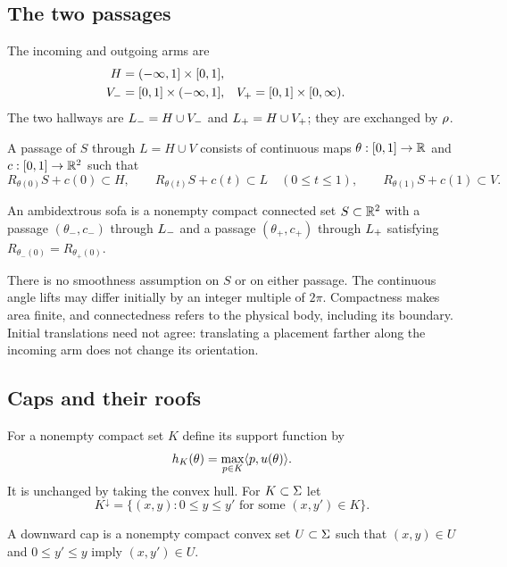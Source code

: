\subsection{The two passages}
The incoming and outgoing arms are
\begin{align*}
 H&=(-\infty,1]\times[0,1],\\
 V_-&=[0,1]\times(-\infty,1],&
 V_+&=[0,1]\times[0,\infty).
\end{align*}
The two hallways are $L_-=H\cup V_-$ and $L_+=H\cup V_+$;
they are exchanged by $\rho$.

\begin{definition}\label{def:passage}
A passage of $S$ through $L=H\cup V$ consists of continuous maps
$\theta:[0,1]\to\mathbb{R}$ and $c:[0,1]\to\mathbb{R}^2$ such that
\[
 R_{\theta(0)}S+c(0)\subset H,\qquad
 R_{\theta(t)}S+c(t)\subset L\quad(0\le t\le1),\qquad
 R_{\theta(1)}S+c(1)\subset V.
\]
\end{definition}

\begin{definition}\label{def:ambidextrous}
An ambidextrous sofa is a nonempty compact connected set
$S\subset\mathbb{R}^2$ with a passage $(\theta_-,c_-)$ through $L_-$ and
a passage $(\theta_+,c_+)$ through $L_+$ satisfying
$R_{\theta_-(0)}=R_{\theta_+(0)}$.
\end{definition}

There is no smoothness assumption on $S$ or on either passage. The
continuous angle lifts may differ initially by an integer multiple of
$2\pi$. Compactness makes area finite, and connectedness refers to the
physical body, including its boundary. Initial translations need not
agree: translating a placement farther along the incoming arm does
not change its orientation.

\subsection{Caps and their roofs}
For a nonempty compact set $K$ define its support function by
\[
 h_K(\theta)=\max_{p\in K}\langle p,u(\theta)\rangle.
\]
It is unchanged by taking the convex hull. For $K\subset\Sigma$ let
\[
 K^\downarrow=\{(x,y):0\le y\le y'
              \text{ for some }(x,y')\in K\}.
\]

\begin{definition}\label{def:cap}
A downward cap is a nonempty compact convex set $U\subset\Sigma$
such that $(x,y)\in U$ and $0\le y'\le y$ imply $(x,y')\in U$.
\end{definition}

